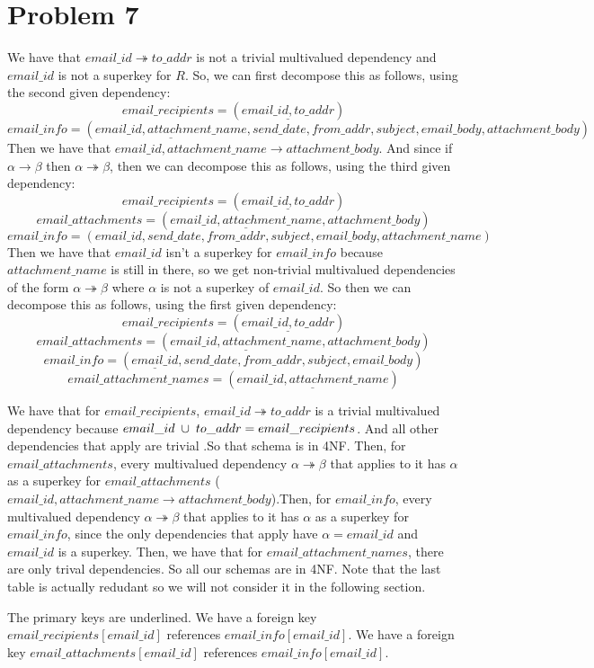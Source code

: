 \documentclass{article}
\begin{document}
\section*{Problem 7}
We have that $email\_id \twoheadrightarrow to\_addr$ is not a trivial
multivalued dependency and $email\_id$ is not a superkey for $R$.
So, we can first decompose this as follows, using the second given dependency:
\[ email\_recipients = (\underline{email\_id, to\_addr}) \]
\[ email\_info = (\underline{email\_id, attachment\_name}, send\_date,
    from\_addr, subject, email\_body, attachment\_body) \]
Then we have that $email\_id, attachment\_name \rightarrow attachment\_body$.
And since if $\alpha \rightarrow \beta$ then $\alpha \twoheadrightarrow \beta$,
then we can decompose this as follows, using the third given dependency:
\[ email\_recipients = (\underline{email\_id, to\_addr}) \]
\[ email\_attachments = (\underline{email\_id, attachment\_name},
    attachment\_body) \]
\[ email\_info = (email\_id, send\_date,
    from\_addr, subject, email\_body, attachment\_name) \]
Then we have that $email\_id$ isn't a superkey for $email\_info$ because
$attachment\_name$ is still in there, so we get non-trivial multivalued
dependencies of the form $\alpha \twoheadrightarrow \beta$ where $\alpha$
is not a superkey of $email\_id$. So then we can decompose this as follows,
using the first given dependency:
\[ email\_recipients = (\underline{email\_id, to\_addr}) \]
\[ email\_attachments = (\underline{email\_id, attachment\_name},
    attachment\_body) \]
\[ email\_info = (\underline{email\_id}, send\_date, from\_addr, subject,
    email\_body) \]
\[ email\_attachment\_names = (\underline{email\_id, attachment\_name}) \]

We have that for $email\_recipients$, $email\_id \twoheadrightarrow to\_addr$
is a trivial multivalued dependency because
$email\_id \hspace{1mm} \cup \hspace{1mm} to\_addr = email\_recipients$. And
all other dependencies that apply are trivial .So
that schema is in 4NF. Then, for $email\_attachments$, every multivalued
dependency $\alpha \twoheadrightarrow \beta$ that applies to it has $\alpha$
as a superkey for $email\_attachments$ ($email\_id, attachment\_name \rightarrow
attachment\_body$).Then, for $email\_info$, every multivalued
dependency $\alpha \twoheadrightarrow \beta$ that applies to it has $\alpha$
as a superkey for $email\_info$, since the only dependencies that apply
have $\alpha = email\_id$ and $email\_id$ is a superkey. Then, we have
that for $email\_attachment\_names$, there are only trival dependencies. So
all our schemas are in 4NF. Note that the last table is actually redudant
so we will not consider it in the following section.

The primary keys are underlined. We have a foreign key
$email\_recipients[email\_id]$ references $email\_info[email\_id]$.
We have a foreign key $email\_attachments[email\_id]$ references
$email\_info[email\_id]$.
\end{document}
